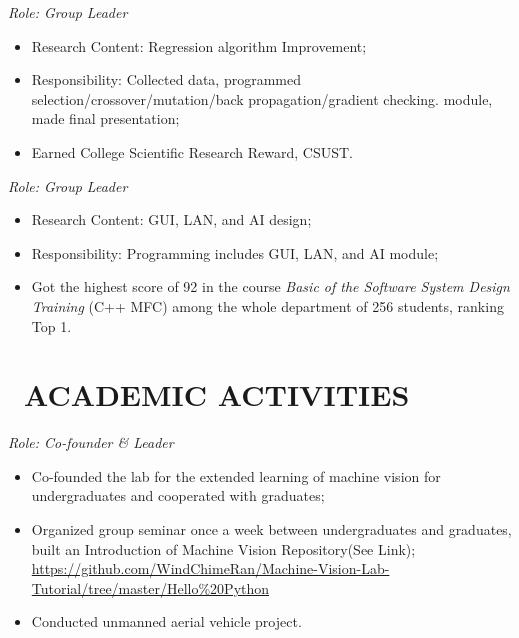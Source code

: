 \documentclass{resume}
\begin{document}
\textit{Role: Group Leader}{}
\begin{itemize}
 \item Research Content: Regression algorithm Improvement;
 \item Responsibility: Collected data, programmed selection/crossover/mutation/back propagation/gradient checking.
module, made final presentation;
 \item Earned College Scientific Research Reward, CSUST.
\end{itemize}

\textit{Role: Group Leader}{}
\begin{itemize}
 \item Research Content: GUI, LAN, and AI design;
 \item Responsibility: Programming includes GUI, LAN, and AI module;
 \item Got the highest score of 92 in the course \textit{Basic of the Software System Design Training} (C++
MFC) among the whole department of 256 students, ranking Top 1.
\end{itemize}


\section{\faUniversity\ ACADEMIC ACTIVITIES}
\textit{Role: Co-founder \& Leader}{}
\begin{itemize}
 \item Co-founded the lab for the extended learning of machine vision for undergraduates and cooperated with graduates;
 \item Organized group seminar once a week between undergraduates and graduates, built an
Introduction of Machine Vision Repository(See Link); 
\\
\url{https://github.com/WindChimeRan/Machine-Vision-Lab-Tutorial/tree/master/Hello\%20Python}

 \item Conducted unmanned aerial vehicle project.
\end{itemize}
\end{document}
